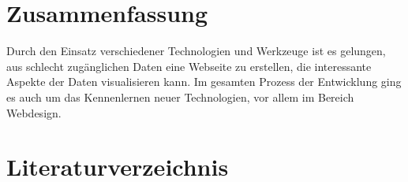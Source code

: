 \documentclass[12pt,a4paper]{scrreprt}
\begin{document}
\chapter*{Zusammenfassung}
Durch den Einsatz verschiedener Technologien und Werkzeuge ist es gelungen, aus schlecht zugänglichen Daten eine Webseite zu erstellen, die interessante Aspekte der Daten visualisieren kann. Im gesamten Prozess der Entwicklung ging es auch um das Kennenlernen neuer Technologien, vor allem im Bereich Webdesign.

\newpage

\chapter*{Literaturverzeichnis}
\printbibliography	
\newpage

\newpage
\end{document}
